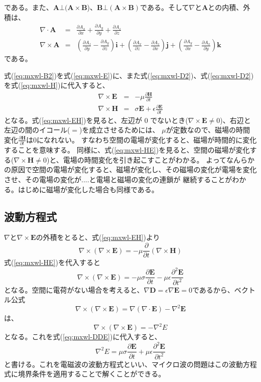 である。また、$\bm{A}\bot(\bm{A}\times\bm{B}$)、$\bm{B}\bot(\bm{A}\times\bm{B})$である。そして$\nabla$と$\bm{A}$との内積、外積は、
\begin{eqnarray*}
\nabla \cdot \bm{A} &=& \frac{\partial A_x}{\partial x} + \frac{\partial A_y}{\partial y} + \frac{\partial A_z}{\partial z} \\
\nabla \times\bm{A} &=& (\frac{\partial A_z}{\partial y} - \frac{\partial A_y}{\partial z})\bm{i} + (\frac{\partial A_x}{\partial z} - \frac{\partial A_z}{\partial x})\bm{j} + (\frac{\partial A_y}{\partial x} - \frac{\partial A_x}{\partial y})\bm{k}
\end{eqnarray*}
である。

式(\ref{eq:mxwl-B2})を式(\ref{eq:mxwl-E})に、また式(\ref{eq:mxwl-D2})、式(\ref{eq:mxwl-D2})を式(\ref{eq:mxwl-H})に代入すると、
\begin{eqnarray}
\nabla \times \bm{E} &=& -\mu\frac{\partial \bm{H}}{\partial t} \label{eq:mxwl-EH}\\
\nabla \times \bm{H} &=& \sigma\bm{E} + \epsilon\frac{\partial \bm{E}}{\partial t} \label{eq:mxwl-HE}
\end{eqnarray}
となる。式(\ref{eq:mxwl-EH})を見ると、左辺が $0$ でないとき($\nabla\times\bm{E}\neq 0$)、右辺と左辺の間のイコール($=$)を成立させるためには、
$\mu$が定数なので、磁場の時間変化$\frac{\partial \bm{H}}{\partial t}$は$0$になれない。
すなわち空間の電場が変化すると、磁場が時間的に変化することを意味する。
同様に、式(\ref{eq:mxwl-HE})を見ると、空間の磁場が変化する($\nabla\times\bm{H}\neq 0$)と、電場の時間変化を引き起こすことがわかる。
よってなんらかの原因で空間の電場が変化すると、磁場が変化し、その磁場の変化が電場を変化させ、その電場の変化が....と電場と磁場の変化の連鎖が
継続することがわかる。はじめに磁場が変化した場合も同様である。

\subsection*{波動方程式}
$\nabla$と$\nabla\times\bm{E}$の外積をとると、式(\ref{eq:mxwl-EH})より
\[
\nabla\times(\nabla\times\bm{E}) = -\mu \frac{\partial}{\partial t}(\nabla\times\bm{H})
\]
式(\ref{eq:mxwl-HE})を代入すると
\begin{equation}
\nabla\times(\nabla\times\bm{E}) = -\mu \sigma\frac{\partial\bm{E}}{\partial t} - \mu\epsilon\frac{\partial^2 \bm{E}}{\partial t^2} \label{eq:mxwl-DDE}
\end{equation}
となる。空間に電荷がない場合を考えると、$\nabla\bm{D}=\epsilon\nabla\bm{E} = 0$であるから、ベクトル公式
\[\nabla\times(\nabla\times\bm{E}) = \nabla(\nabla\cdot\bm{E})-\nabla^2\bm{E}
\]
は、
\[
\nabla\times(\nabla\times\bm{E}) = -\nabla^2 E
\]
となる。これを式(\ref{eq:mxwl-DDE})に代入すると、
\begin{equation}
\nabla^2 E = \mu \sigma\frac{\partial\bm{E}}{\partial t} + \mu\epsilon\frac{\partial^2 \bm{E}}{\partial t^2} \label{eq:mxwl-wveq}
\end{equation}
と書ける。これを電磁波の波動方程式といい、マイクロ波の問題はこの波動方程式に境界条件を適用することで解くことができる。


